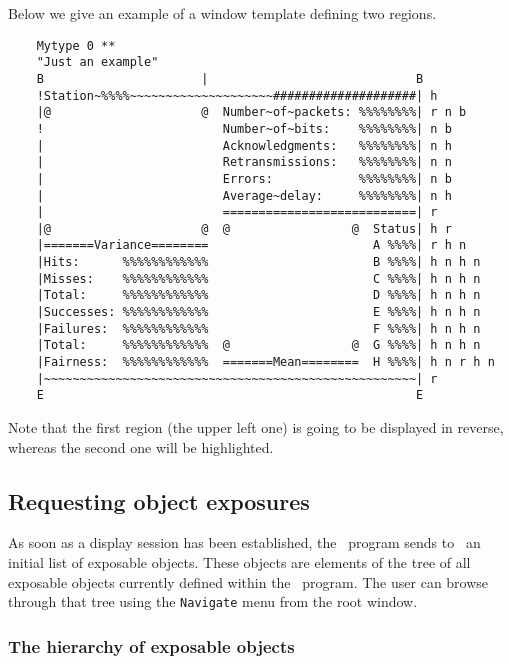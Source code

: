 \noindent
Below we give an example of a window template defining two regions.
{\small
\begin{verbatim}
    Mytype 0 **
    "Just an example"
    B                      |                             B
    !Station~%%%%~~~~~~~~~~~~~~~~~~~~####################| h
    |@                     @  Number~of~packets: %%%%%%%%| r n b
    !                         Number~of~bits:    %%%%%%%%| n b
    |                         Acknowledgments:   %%%%%%%%| n h
    |                         Retransmissions:   %%%%%%%%| n n
    |                         Errors:            %%%%%%%%| n b
    |                         Average~delay:     %%%%%%%%| n h
    |                         ===========================| r
    |@                     @  @                 @  Status| h r
    |=======Variance========                       A %%%%| r h n
    |Hits:      %%%%%%%%%%%%                       B %%%%| h n h n
    |Misses:    %%%%%%%%%%%%                       C %%%%| h n h n
    |Total:     %%%%%%%%%%%%                       D %%%%| h n h n
    |Successes: %%%%%%%%%%%%                       E %%%%| h n h n
    |Failures:  %%%%%%%%%%%%                       F %%%%| h n h n
    |Total:     %%%%%%%%%%%%  @                 @  G %%%%| h n h n
    |Fairness:  %%%%%%%%%%%%  =======Mean========  H %%%%| h n r h n
    |~~~~~~~~~~~~~~~~~~~~~~~~~~~~~~~~~~~~~~~~~~~~~~~~~~~~| r
    E                                                    E
\end{verbatim}}

Note that the first region (the upper left one) is going to be displayed
in reverse, whereas the second one will be highlighted.

\subsection{Requesting object exposures}
\label{rm_ds_om}

As soon as a display session has been established, the \smurph\ program sends
to \dsd\ an initial list of exposable objects.
These objects are elements of the tree of all exposable objects currently
defined within the \smurph\ program.
The user can browse through that tree using the {\tt Navigate} menu
from the root window.

\subsubsection{The hierarchy of exposable objects}
\label{rm_ds_om_oh}

